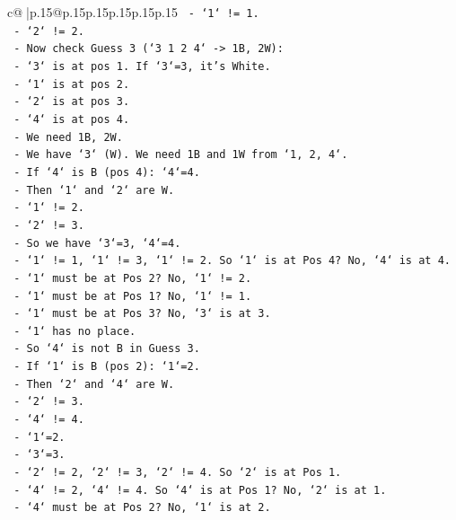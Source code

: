 \documentclass{article}
\begin{document}
{\begin{supertabular}{c@{$\;$}|p{.15\linewidth}@{}p{.15\linewidth}p{.15\linewidth}p{.15\linewidth}p{.15\linewidth}p{.15\linewidth}}
{{{\texttt{        {-} `1` != 1.} \\
\texttt{        {-} `2` != 2.} \\
\texttt{    {-} Now check Guess 3 (`3 1 2 4` {-}> 1B, 2W):} \\
\texttt{        {-} `3` is at pos 1. If `3`=3, it's White.} \\
\texttt{        {-} `1` is at pos 2.} \\
\texttt{        {-} `2` is at pos 3.} \\
\texttt{        {-} `4` is at pos 4.} \\
\texttt{        {-} We need 1B, 2W.} \\
\texttt{        {-} We have `3` (W). We need 1B and 1W from `1, 2, 4`.} \\
\texttt{        {-} If `4` is B (pos 4): `4`=4.} \\
\texttt{            {-} Then `1` and `2` are W.} \\
\texttt{            {-} `1` != 2.} \\
\texttt{            {-} `2` != 3.} \\
\texttt{        {-} So we have `3`=3, `4`=4.} \\
\texttt{        {-} `1` != 1, `1` != 3, `1` != 2. So `1` is at Pos 4? No, `4` is at 4.} \\
\texttt{        {-} `1` must be at Pos 2? No, `1` != 2.} \\
\texttt{        {-} `1` must be at Pos 1? No, `1` != 1.} \\
\texttt{        {-} `1` must be at Pos 3? No, `3` is at 3.} \\
\texttt{        {-} `1` has no place.} \\
\texttt{        {-} So `4` is not B in Guess 3.} \\
\texttt{        {-} If `1` is B (pos 2): `1`=2.} \\
\texttt{            {-} Then `2` and `4` are W.} \\
\texttt{            {-} `2` != 3.} \\
\texttt{            {-} `4` != 4.} \\
\texttt{            {-} `1`=2.} \\
\texttt{            {-} `3`=3.} \\
\texttt{            {-} `2` != 2, `2` != 3, `2` != 4. So `2` is at Pos 1.} \\
\texttt{            {-} `4` != 2, `4` != 4. So `4` is at Pos 1? No, `2` is at 1.} \\
\texttt{            {-} `4` must be at Pos 2? No, `1` is at 2.} \\
}}}
\end{supertabular}}
\end{document}

